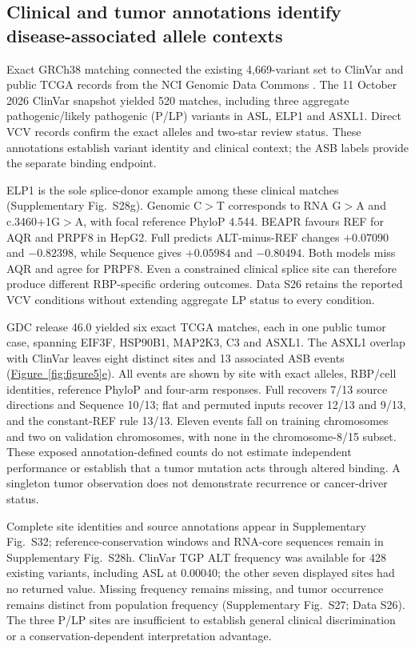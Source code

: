 \documentclass[webpdf,contemporary,large]{oup-authoring-template}
\newcommand{\figpanelref}[2]{\hyperref[#1]{Figure~\ref*{#1}#2}}
\newcommand{\supfig}[1]{Supplementary Fig.~#1}
\begin{document}
\subsection{Clinical and tumor annotations identify disease-associated allele contexts}\label{subsec:disease_variants}

Exact GRCh38 matching connected the existing 4,669-variant set to ClinVar and public TCGA records from the NCI Genomic Data Commons \citep{landrum2018clinvar,grossman2016gdc}. The 11 October 2026 ClinVar snapshot yielded 520 matches, including three aggregate pathogenic/likely pathogenic (P/LP) variants in ASL, ELP1 and ASXL1. Direct VCV records confirm the exact alleles and two-star review status. These annotations establish variant identity and clinical context; the ASB labels provide the separate binding endpoint.

ELP1 is the sole splice-donor example among these clinical matches (\supfig{S28g}). Genomic C$>$T corresponds to RNA G$>$A and c.3460+1G$>$A, with focal reference PhyloP 4.544. BEAPR favours REF for AQR and PRPF8 in HepG2. Full predicts ALT-minus-REF changes $+0.07090$ and $-0.82398$, while Sequence gives $+0.05984$ and $-0.80494$. Both models miss AQR and agree for PRPF8. Even a constrained clinical splice site can therefore produce different RBP-specific ordering outcomes. Data S26 retains the reported VCV conditions without extending aggregate LP status to every condition.

GDC release 46.0 yielded six exact TCGA matches, each in one public tumor case, spanning EIF3F, HSP90B1, MAP2K3, C3 and ASXL1. The ASXL1 overlap with ClinVar leaves eight distinct sites and 13 associated ASB events (\figpanelref{fig:figure5}{e}). All events are shown by site with exact alleles, RBP/cell identities, reference PhyloP and four-arm responses. Full recovers 7/13 source directions and Sequence 10/13; flat and permuted inputs recover 12/13 and 9/13, and the constant-REF rule 13/13. Eleven events fall on training chromosomes and two on validation chromosomes, with none in the chromosome-8/15 subset. These exposed annotation-defined counts do not estimate independent performance or establish that a tumor mutation acts through altered binding. A singleton tumor observation does not demonstrate recurrence or cancer-driver status.

Complete site identities and source annotations appear in \supfig{S32}; reference-conservation windows and RNA-core sequences remain in \supfig{S28h}. ClinVar TGP ALT frequency was available for 428 existing variants, including ASL at 0.00040; the other seven displayed sites had no returned value. Missing frequency remains missing, and tumor occurrence remains distinct from population frequency (\supfig{S27}; Data S26). The three P/LP sites are insufficient to establish general clinical discrimination or a conservation-dependent interpretation advantage.
\end{document}
